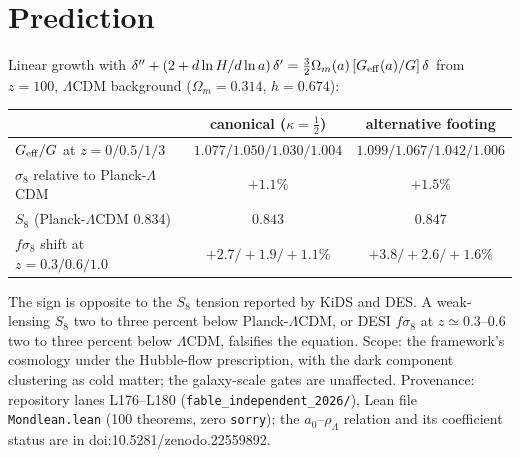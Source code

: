 \documentclass[11pt,letterpaper]{article}
\begin{document}
\section{Prediction}
Linear growth with $\delta''+(2+d\ln H/d\ln a)\,\delta'=\tfrac32\Omega_m(a)\,[G_{\rm eff}(a)/G]\,\delta$ from $z=100$, $\Lambda$CDM background ($\Omega_m=0.314$, $h=0.674$):
\begin{center}\begin{tabular}{lcc}\toprule
 & canonical ($\kappa=\tfrac12$) & alternative footing\\\midrule
$G_{\rm eff}/G$ at $z=0/0.5/1/3$ & $1.077/1.050/1.030/1.004$ & $1.099/1.067/1.042/1.006$\\
$\sigma_8$ relative to Planck-$\Lambda$CDM & $+1.1\%$ & $+1.5\%$\\
$S_8$ (Planck-$\Lambda$CDM 0.834) & $0.843$ & $0.847$\\
$f\sigma_8$ shift at $z=0.3/0.6/1.0$ & $+2.7/+1.9/+1.1\%$ & $+3.8/+2.6/+1.6\%$\\\bottomrule
\end{tabular}\end{center}
The sign is opposite to the $S_8$ tension reported by KiDS and DES. A weak-lensing $S_8$ two to three percent below Planck-$\Lambda$CDM, or DESI $f\sigma_8$ at $z\simeq0.3$--$0.6$ two to three percent below $\Lambda$CDM, falsifies the equation. Scope: the framework's cosmology under the Hubble-flow prescription, with the dark component clustering as cold matter; the galaxy-scale gates are unaffected. Provenance: repository lanes L176--L180 (\texttt{fable\_independent\_2026/}), Lean file \texttt{Mondlean.lean} (100 theorems, zero \texttt{sorry}); the $a_0$--$\rho_\Lambda$ relation and its coefficient status are in doi:10.5281/zenodo.22559892.
\end{document}
